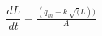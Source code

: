 \documentclass[preview]{standalone}
\begin{document}
\begin{align*}
\dfrac{dL}{dt} = \frac{(q_{in} - k\,\sqrt(L))}{A}
\end{align*}
\end{document}

